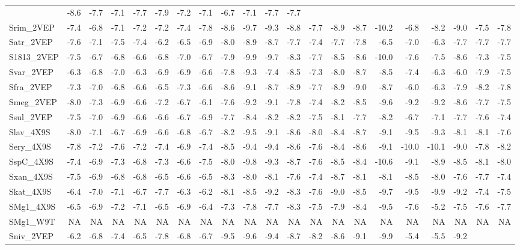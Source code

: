 \documentclass[12pt,twoside]{reedthesis}
\begin{document}
\begin{longtable}[]{@{}lrrrrrrrrrrrrrrrrrrrr@{}}
  & -8.6 & -7.7 & -7.1 & -7.7 & -7.9 & -7.2 & -7.1 & -6.7 & -7.1 & -7.7 &
  -7.7\tabularnewline
  Srim\_2VEP & -7.4 & -6.8 & -7.1 & -7.2 & -7.2 & -7.4 & -7.8 & -8.6 &
  -9.7 & -9.3 & -8.8 & -7.7 & -8.9 & -8.7 & -10.2 & -6.8 & -8.2 & -9.0 &
  -7.5 & -7.8\tabularnewline
  Satr\_2VEP & -7.6 & -7.1 & -7.5 & -7.4 & -6.2 & -6.5 & -6.9 & -8.0 &
  -8.9 & -8.7 & -7.7 & -7.4 & -7.7 & -7.8 & -6.5 & -7.0 & -6.3 & -7.7 &
  -7.7 & -7.7\tabularnewline
  S1813\_2VEP & -7.5 & -6.7 & -6.8 & -6.6 & -6.8 & -7.0 & -6.7 & -7.9 &
  -9.9 & -9.7 & -8.3 & -7.7 & -8.5 & -8.6 & -10.0 & -7.6 & -7.5 & -8.6 &
  -7.3 & -7.5\tabularnewline
  Svar\_2VEP & -6.3 & -6.8 & -7.0 & -6.3 & -6.9 & -6.9 & -6.6 & -7.8 &
  -9.3 & -7.4 & -8.5 & -7.3 & -8.0 & -8.7 & -8.5 & -7.4 & -6.3 & -6.0 &
  -7.9 & -7.5\tabularnewline
  Sfra\_2VEP & -7.3 & -7.0 & -6.8 & -6.6 & -6.5 & -7.3 & -6.6 & -8.6 &
  -9.1 & -8.7 & -8.9 & -7.7 & -8.9 & -9.0 & -8.7 & -6.0 & -6.3 & -7.9 &
  -8.2 & -7.8\tabularnewline
  Smeg\_2VEP & -8.0 & -7.3 & -6.9 & -6.6 & -7.2 & -6.7 & -6.1 & -7.6 &
  -9.2 & -9.1 & -7.8 & -7.4 & -8.2 & -8.5 & -9.6 & -9.2 & -9.2 & -8.6 &
  -7.7 & -7.5\tabularnewline
  Ssul\_2VEP & -7.5 & -7.0 & -6.9 & -6.6 & -6.6 & -6.7 & -6.9 & -7.7 &
  -8.4 & -8.2 & -8.2 & -7.5 & -8.1 & -7.7 & -8.2 & -6.7 & -7.1 & -7.7 &
  -7.6 & -7.4\tabularnewline
  Slav\_4X9S & -8.0 & -7.1 & -6.7 & -6.9 & -6.6 & -6.8 & -6.7 & -8.2 &
  -9.5 & -9.1 & -8.6 & -8.0 & -8.4 & -8.7 & -9.1 & -9.5 & -9.3 & -8.1 &
  -8.1 & -7.6\tabularnewline
  Sery\_4X9S & -7.8 & -7.2 & -7.6 & -7.2 & -7.4 & -6.9 & -7.4 & -8.5 &
  -9.4 & -9.4 & -8.6 & -7.6 & -8.4 & -8.6 & -9.1 & -10.0 & -10.1 & -9.0 &
  -7.8 & -8.2\tabularnewline
  SspC\_4X9S & -7.4 & -6.9 & -7.3 & -6.8 & -7.3 & -6.6 & -7.5 & -8.0 &
  -9.8 & -9.3 & -8.7 & -7.6 & -8.5 & -8.4 & -10.6 & -9.1 & -8.9 & -8.5 &
  -8.1 & -8.0\tabularnewline
  Sxan\_4X9S & -7.5 & -6.9 & -6.8 & -6.8 & -6.5 & -6.6 & -6.5 & -8.3 &
  -8.0 & -8.1 & -7.6 & -7.4 & -8.7 & -8.1 & -8.1 & -8.5 & -8.0 & -7.6 &
  -7.7 & -7.4\tabularnewline
  Skat\_4X9S & -6.4 & -7.0 & -7.1 & -6.7 & -7.7 & -6.3 & -6.2 & -8.1 &
  -8.5 & -9.2 & -8.3 & -7.6 & -9.0 & -8.5 & -9.7 & -9.5 & -9.9 & -9.2 &
  -7.4 & -7.5\tabularnewline
  SMg1\_4X9S & -6.5 & -6.9 & -7.2 & -7.1 & -6.5 & -6.9 & -6.4 & -7.3 &
  -7.8 & -7.7 & -8.3 & -7.5 & -7.9 & -8.4 & -9.5 & -7.6 & -5.2 & -7.5 &
  -7.6 & -7.7\tabularnewline
  SMg1\_W9T & NA & NA & NA & NA & NA & NA & NA & NA & NA & NA & NA & NA &
  NA & NA & NA & NA & NA & NA & NA & NA\tabularnewline
  Sniv\_2VEP & -6.2 & -6.8 & -7.4 & -6.5 & -7.8 & -6.8 & -6.7 & -9.5 &
  -9.6 & -9.4 & -8.7 & -8.2 & -8.6 & -9.1 & -9.9 & -5.4 & -5.5 & -9.2 &

\end{longtable}
\end{document}
